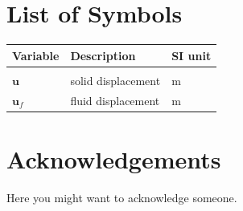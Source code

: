 \documentclass{polimi_template_classic/PoliMi3i_thesis}
\begin{document}
\chapter*{List of Symbols} %
\begin{table}[H]
    \centering
    \begin{tabular}{lll}
        \textbf{Variable} & \textbf{Description} & \textbf{SI unit} \\\hline\\[-9px]
        $\bm{u}$ & solid displacement & m \\[2px]
        $\bm{u}_f$ & fluid displacement & m \\[2px]
    \end{tabular}
\end{table}

\chapter*{Acknowledgements}
Here you might want to acknowledge someone.

\cleardoublepage
\end{document}
